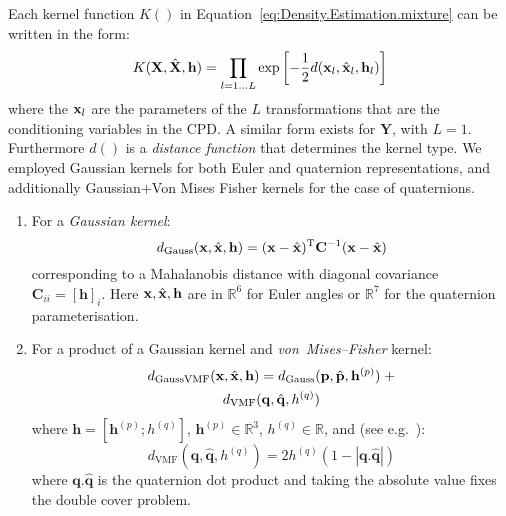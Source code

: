 Each kernel function $K()$ in Equation~\eqref{eq:Density.Estimation.mixture} can be written in the form:
\begin{equation}
K(\mathbf{X}, \hat{\mathbf{X}}, \mathbf{h}) =
\mathop{\prod}_{l=1 \ldots L} \exp \left[-\frac{1}{2}d(\bx_l, \hat{\bx}_l, \mathbf{h}_l)\right]
\label{eq:Density.Estimation.kernel}
\end{equation}
\noindent where the $\mathbf{x}_l$ are the parameters of the $L$ transformations that are the conditioning variables in the CPD. A similar form exists for $\mathbf{Y}$, with $L=1$. Furthermore $d()$ is a \textit{distance function} that determines the kernel type. We employed Gaussian kernels for both Euler and quaternion representations, and additionally Gaussian+Von Mises Fisher kernels for the case of quaternions.
\begin{enumerate}
\item For a \textit{Gaussian kernel}:
\begin{equation}
d_\mathrm{Gauss}(\bx, \hat{\bx}, \mathbf{h}) =
(\bx - \hat{\bx})^\mathrm{T}\mathbf{C}^{-1}(\bx - \hat{\bx})
\label{eq:Density.Estimation.gaussiandist}
\end{equation}
\noindent corresponding to a Mahalanobis distance with diagonal covariance
$\mathbf{C}_{ii} = [\mathbf{h}]_i$.
Here $\mathbf{x}, \hat{\mathbf{x}}, \mathbf{h}$ are in $\mathbb{R}^6$ for Euler angles or $\mathbb{R}^7$ for the quaternion parameterisation.
\item For a product of a Gaussian kernel and \textit{von~Mises--Fisher} kernel:
\begin{multline}
d_\mathrm{GaussVMF}(\bx, \hat{\bx}, \mathbf{h}) =
d_\mathrm{Gauss}(\mathbf{p}, \hat{\mathbf{p}}, \mathbf{h}^{(p)}) \; +\\
d_\mathrm{VMF}(\mathbf{q}, \hat{\mathbf{q}}, h^{(q)})
\label{eq:Density.Estimation.gaussvmfdist}
\end{multline}
\noindent where %
$\mathbf{h} = \left[ \mathbf{h}^{(p)} ; h^{(q)} \right]$,
$\mathbf{h}^{(p)} \in \mathbb{R}^3$,
$h^{(q)} \in \mathbb{R}$,
and (see e.g.\ \cite{abramowitz_handbook_1965}):
\begin{equation}
d_\mathrm{VMF}(\mathbf{q}, \hat{\mathbf{q}}, h^{(q)}) =
2 h^{(q)} \left(1 - \left| \mathbf{q} . \hat{\mathbf{q}} \right|\right)
\label{eq:Density.Estimation.vmfdist}
\end{equation}
\noindent where $\mathbf{q} . \hat{\mathbf{q}}$ is the quaternion dot product and taking the absolute value fixes the double cover problem.
\end{enumerate}

